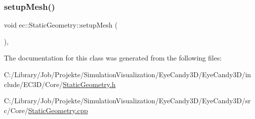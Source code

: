 \subsubsection{\texorpdfstring{setup\+Mesh()}{setupMesh()}}
{\footnotesize\ttfamily void ec\+::\+Static\+Geometry\+::setup\+Mesh (\begin{DoxyParamCaption}{ }\end{DoxyParamCaption})\hspace{0.3cm}{\ttfamily [protected]}, {\ttfamily [virtual]}}



The documentation for this class was generated from the following files\+:\begin{DoxyCompactItemize}
\item 
C\+:/\+Library/\+Job/\+Projekte/\+Simulation\+Visualization/\+Eye\+Candy3\+D/\+Eye\+Candy3\+D/include/\+E\+C3\+D/\+Core/\mbox{\hyperlink{_static_geometry_8h}{Static\+Geometry.\+h}}\item 
C\+:/\+Library/\+Job/\+Projekte/\+Simulation\+Visualization/\+Eye\+Candy3\+D/\+Eye\+Candy3\+D/src/\+Core/\mbox{\hyperlink{_static_geometry_8cpp}{Static\+Geometry.\+cpp}}\end{DoxyCompactItemize}
